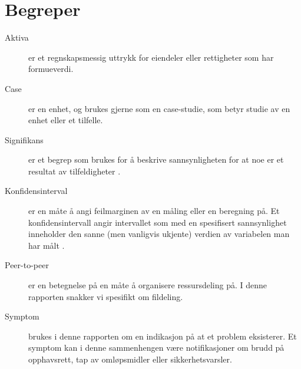 \section*{Begreper}
\begin{description}
    \item[Aktiva] er et regnskapsmessig uttrykk for eiendeler eller rettigheter som har formueverdi.
    \item[Case] er en enhet, og brukes gjerne som en case-studie, som betyr studie av en enhet eller et tilfelle.
    \item[Signifikans] er et begrep som brukes for å beskrive sannsynligheten for at noe er et resultat av tilfeldigheter \cite{wiki:sig}.
    \item[Konfidensinterval] er en måte å angi feilmarginen av en måling eller en beregning på. Et konfidensintervall angir intervallet som med en spesifisert sannsynlighet inneholder den sanne (men vanligvis ukjente) verdien av variabelen man har målt \cite{wiki:konfidens}.
    \item[Peer-to-peer] er en betegnelse på en måte å organisere ressursdeling på. I denne rapporten snakker vi spesifikt om fildeling. 
    \item[Symptom] brukes i denne rapporten om en indikasjon på at et problem eksisterer. Et symptom kan i denne sammenhengen være notifikasjoner om brudd på opphavsrett, tap av omløpsmidler eller sikkerhetsvarsler. 
\end{description}